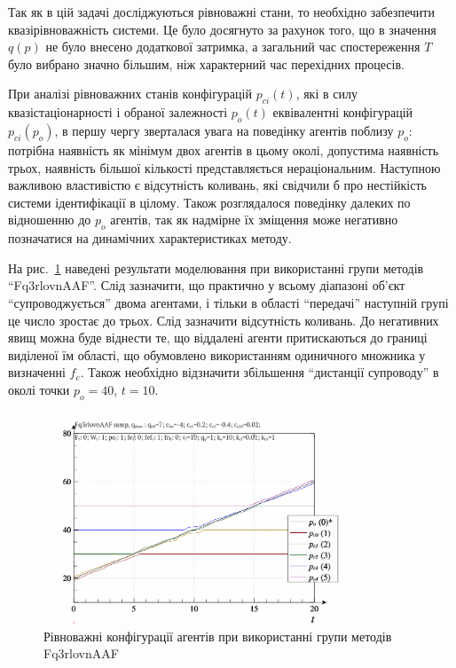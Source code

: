 Так як в цій задачі досліджуються рівноважні стани, то
необхідно забезпечити квазірівноважність системи. Це було
досягнуто за рахунок того, що в значення
$q(p)$ не було внесено додаткової затримка, а загальний час
спостереження
$T$ було вибрано значно більшим, ніж характерний час
перехідних процесів.

При аналізі рівноважних станів конфігурацій
$ p_{ci} (t) $, які в силу квазістаціонарності і обраної залежності
$ p_o (t) $ еквівалентні конфігурацій
$ p_{ci} (p_o) $, в першу чергу зверталася увага на поведінку агентів
поблизу
$p_o$: потрібна наявність як мінімум двох агентів в цьому околі,
допустима наявність трьох, наявність більшої кількості
представляється нераціональним. Наступною важливою властивістю
є відсутність коливань, які свідчили б про нестійкість системи
ідентифікації в цілому. Також розглядалося поведінку далеких
по відношенню до
$ p_o $ агентів, так як надмірне їх зміщення може негативно
позначатися на динамічних характеристиках методу.

На рис.~\ref{atu:f:qls_ramp_Fq3rlovnAAF} наведені результати моделювання при використанні групи методів
``Fq3rlovnAAF''. Слід зазначити, що практично у всьому діапазоні об'єкт
``супроводжується'' двома агентами, і тільки в області ``передачі'' наступній
групі це число зростає до трьох. Слід зазначити відсутність коливань. До
негативних явищ можна буде віднести те, що віддалені агенти притискаються до
границі виділеної їм області, що обумовлено використанням одиничного множника у
визначенні $f_e$. Також необхідно відзначити збільшення
``дистанції супроводу'' в околі точки $p_o = 40$, $t = 10$.

\begin{figure}[htb!]
  \begin{center}
    \includegraphics[width=0.8\textwidth]{p/ramp/qls-p_t_pi_Fq3rlovnAAF_ramp.png}
  \end{center}
  \caption{Рівноважні конфігурації агентів при використанні групи методів Fq3rlovnAAF}
  \label{atu:f:qls_ramp_Fq3rlovnAAF}
\end{figure}

